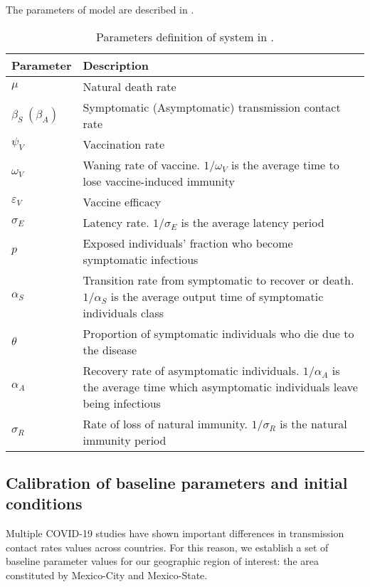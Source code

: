 The parameters of model  are described in 
.
\begin{table*}[tbh]
    \centering
    \begin{tabular}{
        >{\centering}
        p{}
        p{}
    }
        \toprule
        Parameter & Description
        \\
        \midrule
        $\mu$ &  Natural death rate
        \\
        $\beta_S\ (\beta_A)$ & 
            Symptomatic (Asymptomatic) transmission contact rate
        \\
        $\psi_V$ & Vaccination rate
        \\
        $\omega_{V}$ & 
            Waning rate of vaccine. 
            $1/\omega_{V}$ is the average time to lose vaccine-induced immunity
        \\
        $\varepsilon_V$ &  Vaccine efficacy
        \\
        $\sigma_{E}$ & 
        Latency rate. $1/\sigma_{E}$ 
                is the average latency period
        \\
        $p$ & 
            Exposed individuals' fraction who become symptomatic infectious
        \\          
        $\alpha_{S}$ &
            Transition rate from symptomatic to recover or death. 
            $1/\alpha_{S}$ is the average output time of symptomatic individuals class
        \\
        $\theta$ & 
            Proportion of symptomatic individuals who die due to 
            the disease 
        \\ 
        $\alpha_{A}$ 
            & 
            Recovery rate of asymptomatic individuals. $1/\alpha_{A}$ is the
            average time which asymptomatic individuals 
            leave being infectious 
        \\ 
        $\sigma_{R}$ 
            &  
            Rate of loss of natural immunity.  
            $1/\sigma_{R}$ is the natural immunity period
        \\
        \bottomrule
    \end{tabular}
    \caption{Parameters definition of system in .}
    \label{table:parametermodel}
\end{table*}
%
\subsection{Calibration of baseline parameters and initial conditions}
    Multiple COVID-19 studies %
have shown important differences in transmission contact rates values across 
countries. For this reason, we establish a set of baseline parameter values 
for our geographic region of interest: the area constituted by Mexico-City 
and Mexico-State.


